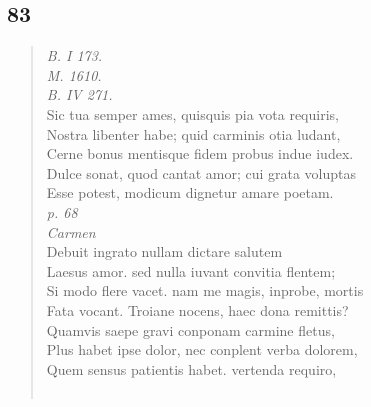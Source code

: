 \documentclass[11pt, a4paper]{report}
\begin{document}
            \subsection*{83}
      \begin{verse}
      \textit{B. I 173.} \\ \textit{M. 1610.} \\ \textit{B. IV 271.} \\ Sic tua semper ames, quisquis pia vota requiris, \\ Nostra libenter habe; quid carminis otia ludant, \\ Cerne bonus mentisque fidem probus indue iudex. \\ Dulce sonat, quod cantat amor; cui grata voluptas \\ Esse potest, modicum dignetur amare poetam. \\ \textit{p. 68} \\ \textit{Carmen} \\ Debuit ingrato nullam dictare salutem \\ Laesus amor. sed nulla iuvant convitia flentem; \\ Si modo flere vacet. nam me magis, inprobe, mortis \\ Fata vocant. Troiane nocens, haec dona remittis? \\ Quamvis saepe gravi conponam carmine fletus, \\ Plus habet ipse dolor, nec conplent verba dolorem, \\ Quem sensus patientis habet. vertenda requiro, \\ 
        ﻿\pagebreak 

\end{verse}
\end{document}
